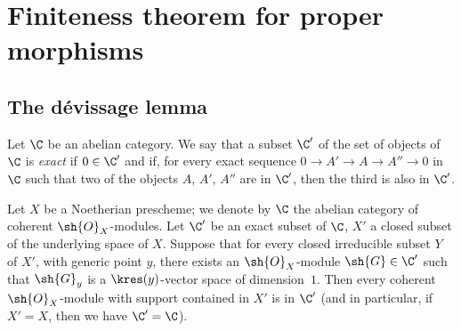 \section{Finiteness theorem for proper morphisms}
\label{section:III.3}

\subsection{The d\'evissage lemma}
\label{subsection:III.3.1}

\begin{definition}[3.1.1]
\label{III.3.1.1}
Let $\C$ be an abelian category.
We say that a subset $\C'$ of the set of objects of $\C$ is \emph{exact} if $0\in\C'$ and if, for every exact sequence $0\to A'\to A\to A''\to 0$ in $\C$ such that two of the objects $A$, $A'$, $A''$ are in $\C'$, then the third is also in $\C'$.
\end{definition}

\begin{theorem}[3.1.2]
\label{III.3.1.2}
Let $X$ be a Noetherian prescheme; we denote by $\C$ the abelian category of coherent $\sh{O}_X$-modules.
Let $\C'$ be an exact subset of $\C$, $X'$ a closed subset of the underlying space of $X$.
Suppose that for every closed irreducible subset $Y$ of $X'$, with generic point $y$, there exists an $\sh{O}_X$-module $\sh{G}\in\C'$ such that $\sh{G}_y$ is a $\kres(y)$-vector space of dimension~$1$.
Then every coherent $\sh{O}_X$-module with support contained in $X'$ is in $\C'$ (and in particular, if $X'=X$, then we have $\C'=\C$).
\end{theorem}

